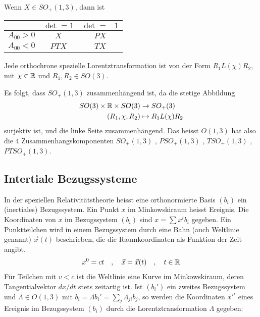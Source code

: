 Wenn $X \in SO_+ (1,3)$, dann ist

\begin{table}[h]
    \centering
    \begin{tabular}{c|cc}
         & $\det = 1$ & $\det = -1$ \\ \hline
        $A_{00} > 0$ & $X$ & $PX$ \\
        $A_{00} < 0$ & $PTX$ & $TX$
    \end{tabular}
\end{table}

\begin{lemma}
    Jede orthochrone spezielle Lorentztransformation ist von der Form
    $R_1 L(\chi) R_2$, mit $\chi \in \mathbb{R}$ und $R_1 , R_2 \in SO(3)$.
\end{lemma}

\begin{bemerkung}
    Es folgt, dass $SO_+ (1,3)$ zusammenhängend ist, da die stetige Abbildung
    \begin{align*}
        SO(3) \times \mathbb{R} \times SO(3) &\rightarrow SO_+ (3)
        \\
        (R_1,\chi,R_2) &\mapsto R_1 L(\chi) R_2
    \end{align*}
    surjektiv ist, und die linke Seite zusammenhängend. Das heisst $O(1,3)$
    hat also die $4$ Zusammenhangskomponenten $SO_+ (1,3)$ , $P SO_+ (1,3)$
    , $T SO_+ (1,3)$ , $P T SO_+ (1,3)$.
\end{bemerkung}


\subsection{Intertiale Bezugssysteme}

In der speziellen Relativitätstheorie heisst eine orthonormierte Basis $(b_i)$
ein (inertiales) Bezugssystem. Ein Punkt $x$ im Minkowskiraum heisst Ereignis.
Die Koordinaten von $x$ im Bezugssystem $(b_i)$ sind $x = \sum x^i b_i$
gegeben. Ein Punktteilchen wird in einem Bezugssystem durch eine Bahn (auch
Weltlinie genannt) $\vec{x}(t)$ beschrieben, die die Raumkoordinaten als
Funktion der Zeit angibt.
\begin{align*}
    x^0 = c t \hspace{10pt} , \hspace{10pt} \vec{x} = \vec{x} (t)
    \hspace{10pt} , \hspace{10pt} t \in \mathbb{R}
\end{align*}
Für Teilchen mit $v<c$ ist die Weltlinie eine Kurve im Minkowskiraum, deren
Tangentialvektor $dx/dt$ stets zeitartig ist. Ist $(b_i')$ ein zweites
Bezugssystem und $\Lambda \in O(1,3)$ mit $b_i = \Lambda b_i' = \sum_j
\Lambda_{ji} b_j$, so werden die Koordinaten $x'^{i}$ eines Ereignis im
Bezugssystem $(b_i)$ durch die Lorentztransformation $\Lambda$ gegeben:

